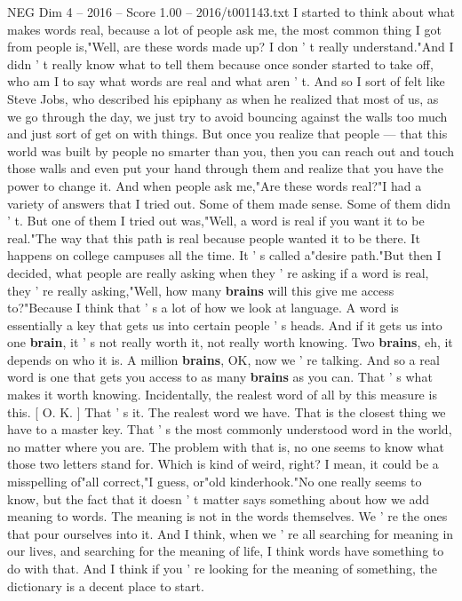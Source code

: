 \begin{textsample}{NEG Dim 4 – 2016 – Score 1.00 – 2016/t001143.txt}
I started to think about what makes words real, because a lot of people ask me, the most common thing I got from people is,"Well, are these words made up?
I don ' t really understand."And I didn ' t really know what to tell them because once sonder started to take off, who am I to say what words are real and what aren ' t.
And so I sort of felt like Steve Jobs, who described his epiphany as when he realized that most of us, as we go through the day, we just try to avoid bouncing against the walls too much and just sort of get on with things.
But once you realize that people — that this world was built by people no smarter than you, then you can reach out and touch those walls and even put your hand through them and realize that you have the power to change it.
And when people ask me,"Are these words real?"I had a variety of answers that I tried out.
Some of them made sense.
Some of them didn ' t.
But one of them I tried out was,"Well, a word is real if you want it to be real."The way that this path is real because people wanted it to be there.
It happens on college campuses all the time.
It ' s called a"desire path."But then I decided, what people are really asking when they ' re asking if a word is real, they ' re really asking,"Well, how many \textbf{brains} will this give me access to?"Because I think that ' s a lot of how we look at language.
A word is essentially a key that gets us into certain people ' s heads.
And if it gets us into one \textbf{brain}, it ' s not really worth it, not really worth knowing.
Two \textbf{brains}, eh, it depends on who it is.
A million \textbf{brains}, OK, now we ' re talking.
And so a real word is one that gets you access to as many \textbf{brains} as you can.
That ' s what makes it worth knowing.
Incidentally, the realest word of all by this measure is this. [ O.
K. ] That ' s it.
The realest word we have.
That is the closest thing we have to a master key.
That ' s the most commonly understood word in the world, no matter where you are.
The problem with that is, no one seems to know what those two letters stand for.
Which is kind of weird, right?
I mean, it could be a misspelling of"all correct,"I guess, or"old kinderhook."No one really seems to know, but the fact that it doesn ' t matter says something about how we add meaning to words.
The meaning is not in the words themselves.
We ' re the ones that pour ourselves into it.
And I think, when we ' re all searching for meaning in our lives, and searching for the meaning of life, I think words have something to do with that.
And I think if you ' re looking for the meaning of something, the dictionary is a decent place to start.

\end{textsample}

